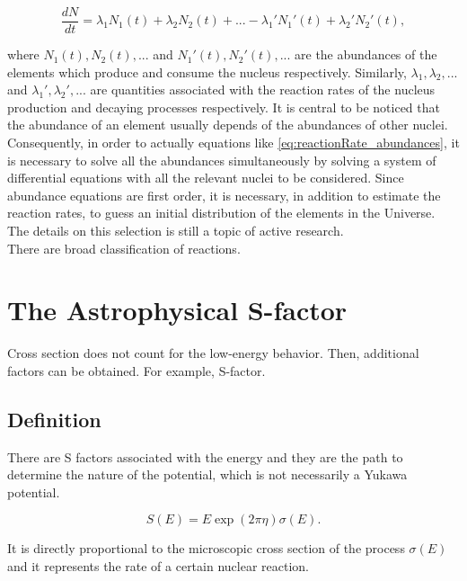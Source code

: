 \documentclass[openany]{book}
\begin{document}
 \begin{equation}\label{eq:reactionRate_abundances}
 	\frac{dN}{dt} = \lambda_1 N_1(t) + \lambda_2 N_2(t)  + ... -  \lambda_1' N_1'(t) + \lambda_2' N_2'(t),
 \end{equation}

where $N_1(t), N_2(t), ...$ and $N_1'(t), N_2'(t), ...$ are the abundances of the elements which produce and consume the nucleus respectively. Similarly,  $\lambda_1, \lambda_2, ...$ and  $\lambda_1', \lambda_2', ...$ are quantities associated with the reaction rates of the nucleus production and decaying processes respectively. It is central to be noticed that the abundance of an element usually depends of the abundances of other nuclei. Consequently, in order to actually equations like \ref{eq:reactionRate_abundances}, it is necessary to solve all the abundances simultaneously by solving a system of differential equations with all the relevant nuclei to be considered. Since abundance equations are first order, it is necessary, in addition to estimate the reaction rates, to guess an initial distribution of the elements in the Universe. The details on this selection is still a topic of active research. \\

There are broad classification of reactions. 

\section{The Astrophysical S-factor} \label{sec:sFactor}

Cross section does not count for the low-energy behavior. Then, additional factors can be obtained. For example, S-factor.
\subsection{Definition} \label{sub:sfactorMotivationDefinition}

There are S factors associated with the energy and they are the path to determine the nature of the potential, which is not necessarily a Yukawa potential.

\begin{equation} \label{eq:sfactor_definition}
	S(E) = E \exp({2\pi\eta}) \sigma({E}).
\end{equation} %

It is directly proportional to the microscopic cross section of the process $\sigma(E)$ and it represents the rate of a certain nuclear reaction.  \\
\end{document}
